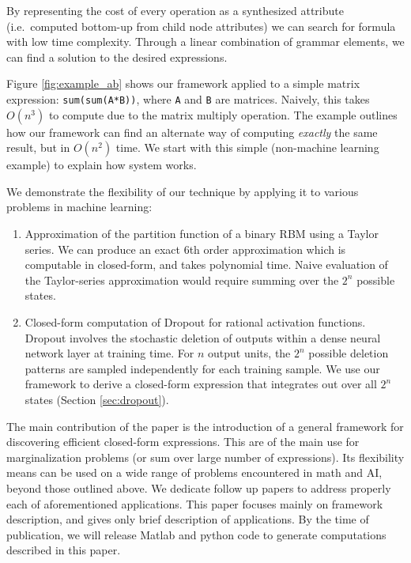 \noindent
By representing the cost of every operation as a synthesized attribute
(i.e.~computed bottom-up from child node attributes) we can search for
formula with low time complexity. Through a linear combination of
grammar elements, we can find a solution to the desired
expressions. 



Figure \ref{fig:example_ab} shows our framework applied to a simple matrix expression:
\texttt{sum(sum(A*B))}, where \texttt{A} and \texttt{B} are matrices. Naively, this takes $O(n^3)$ to compute due to
the matrix multiply operation. The example outlines how our framework
can find an alternate way of computing {\em exactly} the same result,
but in $O(n^2)$ time. We start with this simple (non-machine learning example) to
explain how system works.

We demonstrate the flexibility of our technique by applying it to 
various problems in machine learning: 
\begin{enumerate}
\vspace{-2mm}
\item Approximation of the partition function of a binary RBM using a
  Taylor series. We can produce an exact 6th order 
  approximation which is
  computable in closed-form, and takes polynomial time.
  Naive evaluation of the Taylor-series
  approximation would require summing over the $2^n$ possible states.   
\item Closed-form computation of Dropout for rational activation functions. 
  Dropout \cite{hinton2012improving}
  involves the  stochastic deletion of outputs within a dense neural
  network layer at training time. For $n$ output units, the $2^n$
  possible deletion patterns are sampled independently for each
  training sample. We use our framework to derive a closed-form
  expression that integrates out over all $2^n$ states (Section \ref{sec:dropout}).
\end{enumerate}
\vspace{-2mm}

The main contribution of the paper is the introduction of a general
framework for discovering efficient closed-form expressions. This are
of the main use for marginalization problems (or sum over large number of
expressions). Its
flexibility means can be used on a wide range of problems encountered
in math and AI, beyond those outlined above. We dedicate follow up 
papers to address properly each of aforementioned applications. This
paper focuses mainly on framework description, and gives only brief description
of applications. By the time of publication, we will release Matlab and python
code to generate computations described in this paper.

